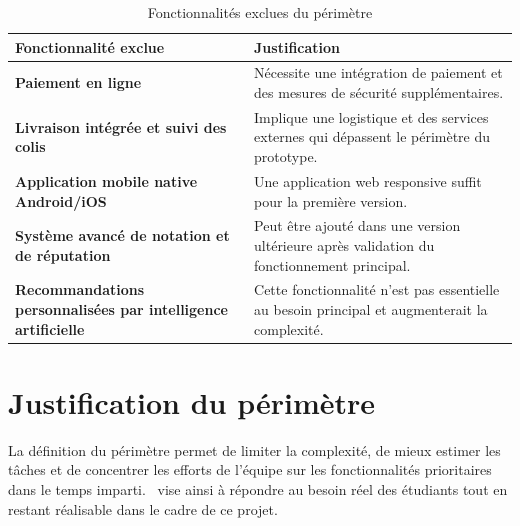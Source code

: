 \begin{table}[h]
\centering
\renewcommand{\arraystretch}{1.25}
\begin{tabularx}{\textwidth}{>{\bfseries}X X}
\toprule
\textbf{Fonctionnalité exclue} & \textbf{Justification} \\
\midrule
Paiement en ligne & Nécessite une intégration de paiement et des mesures de sécurité supplémentaires. \\
Livraison intégrée et suivi des colis & Implique une logistique et des services externes qui dépassent le périmètre du prototype. \\
Application mobile native Android/iOS & Une application web responsive suffit pour la première version. \\
Système avancé de notation et de réputation & Peut être ajouté dans une version ultérieure après validation du fonctionnement principal. \\
Recommandations personnalisées par intelligence artificielle & Cette fonctionnalité n'est pas essentielle au besoin principal et augmenterait la complexité. \\
\bottomrule
\end{tabularx}
\caption{Fonctionnalités exclues du périmètre}
\end{table}

\section{Justification du périmètre}

La définition du périmètre permet de limiter la complexité, de mieux estimer les tâches et de concentrer les efforts de l'équipe sur les fonctionnalités prioritaires dans le temps imparti. \nomProjet\ vise ainsi à répondre au besoin réel des étudiants tout en restant réalisable dans le cadre de ce projet.
